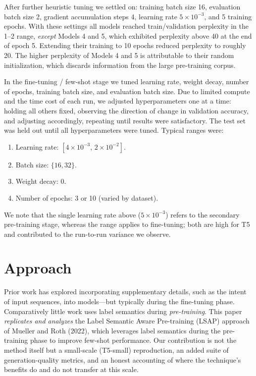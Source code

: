 \documentclass[11pt]{article}
\begin{document}
After further heuristic tuning we settled on: training batch size 16,
evaluation batch size 2, gradient accumulation steps 4, learning rate
$5\times10^{-3}$, and 5 training epochs. With these settings all models
reached train/validation perplexity in the 1--2 range, \emph{except} Models 4
and 5, which exhibited perplexity above 40 at the end of epoch 5. Extending
their training to 10 epochs reduced perplexity to roughly 20. The higher
perplexity of Models 4 and 5 is attributable to their random initialization,
which discards information from the large pre-training corpus.

In the fine-tuning / few-shot stage we tuned learning rate, weight decay,
number of epochs, training batch size, and evaluation batch size. Due to
limited compute and the time cost of each run, we adjusted hyperparameters
one at a time: holding all others fixed, observing the direction of change
in validation accuracy, and adjusting accordingly, repeating until results
were satisfactory. The test set was held out until all hyperparameters were
tuned. Typical ranges were:

\begin{enumerate}
  \item Learning rate: $[4\times10^{-3},\, 2\times10^{-2}]$.
  \item Batch size: $\{16, 32\}$.
  \item Weight decay: 0.
  \item Number of epochs: 3 or 10 (varied by dataset).
\end{enumerate}

We note that the single learning rate above ($5\times10^{-3}$) refers to the
secondary pre-training stage, whereas the range applies to fine-tuning; both
are high for T5 and contributed to the run-to-run variance we observe.

\section{Approach}

Prior work has explored incorporating supplementary details, such as the
intent of input sequences, into models---but typically during the
fine-tuning phase. Comparatively little work uses label semantics during
\emph{pre-training}. This paper \emph{replicates and analyzes} the Label
Semantic Aware Pre-training (LSAP) approach of Mueller and Roth (2022),
which leverages label semantics during the pre-training phase to improve
few-shot performance. Our contribution is not the method itself but a
small-scale (T5-small) reproduction, an added suite of generation-quality
metrics, and an honest accounting of where the technique's benefits do and
do not transfer at this scale.
\end{document}
